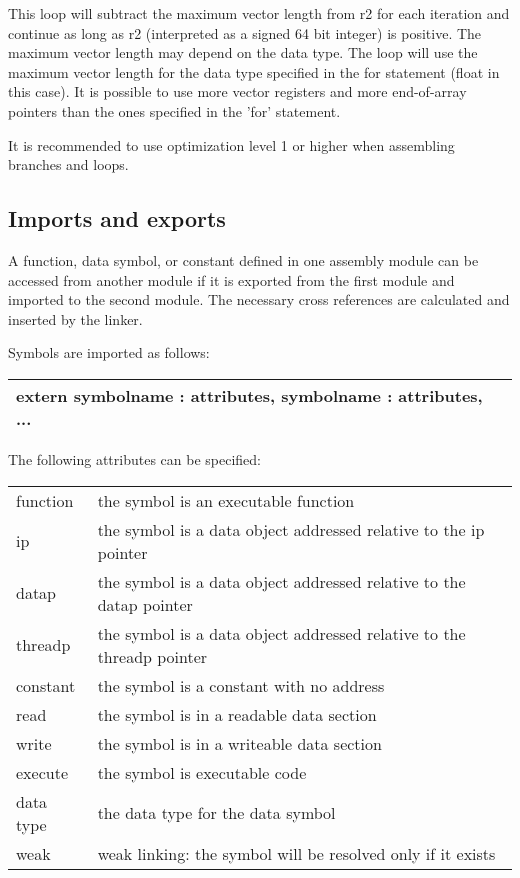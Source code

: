 \documentclass[forwardcom.tex]{subfiles}
\begin{document}
This loop will subtract the maximum vector length from r2 for each iteration and continue as long as r2 (interpreted as a signed 64 bit integer) is positive. The maximum vector length may depend on the data type. The loop will use the maximum vector length for the data type specified in the for statement (float in this case). It is possible to use more vector registers and more end-of-array pointers than the ones specified in the 'for' statement.
\vspace{2mm}

It is recommended to use optimization level 1 or higher when assembling branches and loops.
\vspace{2mm}


\subsection{Imports and exports} \label{assemblyImportExport}
A function, data symbol, or constant defined in one assembly module can be accessed from another module if it is exported from the first module and imported to the second module. The necessary cross references are calculated and inserted by the linker.
\vspace{2mm}

Symbols are imported as follows:
\vspace{2mm}

\begin{tabular}{|p{150mm}|}
\hline
\hspace{4mm} extern symbolname : attributes, symbolname : attributes, ...\\
\hline
\end{tabular}
\vspace{2mm}

The following attributes can be specified:
\vspace{2mm}

\begin{tabular}{|p{20mm}p{130mm}|}
\hline
function & the symbol is an executable function\\
ip & the symbol is a data object addressed relative to the ip pointer\\
datap & the symbol is a data object addressed relative to the datap pointer\\
threadp & the symbol is a data object addressed relative to the threadp pointer\\
constant & the symbol is a constant with no address\\
read & the symbol is in a readable data section\\
write & the symbol is in a writeable data section\\
execute & the symbol is executable code\\
data type & the data type for the data symbol\\
weak & weak linking: the symbol will be resolved only if it exists\\
\hline
\end{tabular}
\vspace{2mm}
\end{document}
